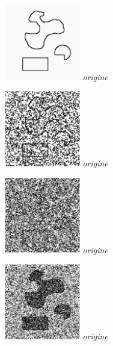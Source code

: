 \documentclass[a4,12pt]{article}
\begin{document}
\begin{minipage}[c]{0.20\linewidth}
	\begin{center}
		\includegraphics[width = 33mm]{./img/p2test_grad_mean_formes2.jpg}
		\textit{origine}
	\end{center}
\end{minipage}
\begin{minipage}[c]{0.20\linewidth}
	\begin{center}
		\includegraphics[width = 33mm]{./img/p2test_grad_mean_formes2pets1.jpg}
		\textit{origine}
	\end{center}
\end{minipage}
\begin{minipage}[c]{0.20\linewidth}
	\begin{center}
		\includegraphics[width = 33mm]{./img/p2test_grad_mean_formes2pets5.jpg}
		\textit{origine}
	\end{center}
\end{minipage}
\begin{minipage}[c]{0.20\linewidth}
	\begin{center}
		\includegraphics[width = 33mm]{./img/p2test_grad_mean_formes2sp1.jpg}
		\textit{origine}
	\end{center}
\end{minipage}
\end{document}

